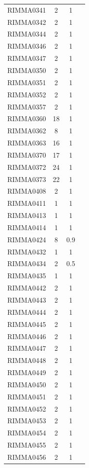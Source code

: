 \documentclass[11pt]{article}
\newcounter{rowno}
\begin{document}
\begin{scriptsize}
\begin{longtable}{>{\stepcounter{rowno}}cccc}
    RIMMA0341 & 2     & 1 \\
    RIMMA0342 & 2     & 1 \\
    RIMMA0344 & 2     & 1 \\
    RIMMA0346 & 2     & 1 \\
    RIMMA0347 & 2     & 1 \\
    RIMMA0350 & 2     & 1 \\
    RIMMA0351 & 2     & 1 \\
    RIMMA0352 & 2     & 1 \\
    RIMMA0357 & 2     & 1 \\
    RIMMA0360 & 18    & 1 \\
    RIMMA0362 & 8     & 1 \\
    RIMMA0363 & 16    & 1 \\
    RIMMA0370 & 17    & 1 \\
    RIMMA0372 & 24    & 1 \\
    RIMMA0373 & 22    & 1 \\
    RIMMA0408 & 2     & 1 \\
    RIMMA0411 & 1     & 1 \\
    RIMMA0413 & 1     & 1 \\
    RIMMA0414 & 1     & 1 \\
    RIMMA0424 & 8     & 0.9 \\
    RIMMA0432 & 1     & 1 \\
    RIMMA0434 & 2     & 0.5 \\
    RIMMA0435 & 1     & 1 \\
    RIMMA0442 & 2     & 1 \\
    RIMMA0443 & 2     & 1 \\
    RIMMA0444 & 2     & 1 \\
    RIMMA0445 & 2     & 1 \\
    RIMMA0446 & 2     & 1 \\
    RIMMA0447 & 2     & 1 \\
    RIMMA0448 & 2     & 1 \\
    RIMMA0449 & 2     & 1 \\
    RIMMA0450 & 2     & 1 \\
    RIMMA0451 & 2     & 1 \\
    RIMMA0452 & 2     & 1 \\
    RIMMA0453 & 2     & 1 \\
    RIMMA0454 & 2     & 1 \\
    RIMMA0455 & 2     & 1 \\
    RIMMA0456 & 2     & 1 \\

\end{longtable}
\end{scriptsize}
\end{document}
